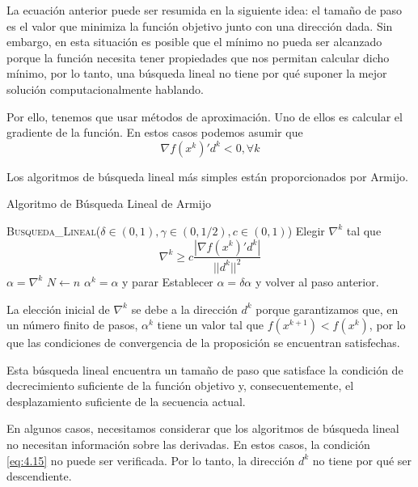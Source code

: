 La ecuación anterior puede ser resumida en la siguiente idea: 
el tamaño de paso es el valor que minimiza la función objetivo junto con una dirección dada. 
Sin embargo, en esta situación es posible que el mínimo no pueda ser alcanzado porque la función necesita tener propiedades que nos permitan calcular dicho mínimo, por lo tanto, una búsqueda lineal no tiene por qué suponer la mejor solución computacionalmente hablando.

Por ello, tenemos que usar métodos de aproximación. 
Uno de ellos es calcular el gradiente de la función. 
En estos casos podemos asumir que
\begin{equation}
\nabla f(x^k)'d^k < 0, \forall k
\label{eq:4.15}
\end{equation}

Los algoritmos de búsqueda lineal más simples están proporcionados por Armijo.

\begin{algorithm}
\caption{Algoritmo de Búsqueda Lineal de Armijo}\label{alg:LocalSearch}
\begin{algorithmic}[1]
\Procedure \textsc{Busqueda\_Lineal}($\delta\in (0,1), \gamma\in (0,1/2), c\in (0,1)$)
\State Elegir $\nabla^k$ tal que\begin{equation*}
\nabla^k \geq c \dfrac{|\nabla f(x^k)'d^k|}{||d^k||^2}
\end{equation*}
\State $\alpha = \nabla^k$
\State $N \gets n$
    \State $\alpha^k = \alpha$ y parar
\Else
    \State Establecer $\alpha = \delta\alpha$ y volver al paso anterior.
\EndIf
\EndProcedure
\end{algorithmic}
\end{algorithm}

La elección inicial de $\nabla^k$ se debe a la dirección $d^k$ porque garantizamos que, en un número finito de pasos, $\alpha^k$ tiene un valor tal que $f(x^{k+1})<f(x^k)$, por lo que las condiciones de convergencia de la proposición se encuentran satisfechas.

Esta búsqueda lineal encuentra un tamaño de paso que satisface la condición de decrecimiento suficiente de la función objetivo y, consecuentemente, el desplazamiento suficiente de la secuencia actual.

En algunos casos, necesitamos considerar que los algoritmos de búsqueda lineal no necesitan información sobre las derivadas. 
En estos casos, la condición \ref{eq:4.15} no puede ser verificada. 
Por lo tanto, la dirección $d^k$ no tiene por qué ser descendiente. 


